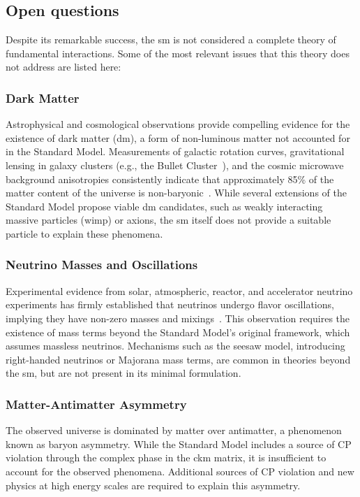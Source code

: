 \subsection*{Open questions}

Despite its remarkable success, the \acrshort{sm} is not considered a complete theory of fundamental interactions. Some of the most relevant issues that this theory does not address are listed here:
\subsubsection*{Dark Matter}

Astrophysical and cosmological observations provide compelling evidence for the existence of dark matter (\acrshort{dm}), a form of non-luminous matter not accounted for in the Standard Model. Measurements of galactic rotation curves, gravitational lensing in galaxy clusters (e.g., the Bullet Cluster~\cite{Clowe_2006}), and the cosmic microwave background anisotropies consistently indicate that approximately 85\% of the matter content of the universe is non-baryonic~\cite{Planck}. While several extensions of the Standard Model propose viable \acrshort{dm} candidates, such as weakly interacting massive particles (\acrshort{wimp}) or axions, the \acrshort{sm} itself does not provide a suitable particle to explain these phenomena.

\subsubsection*{Neutrino Masses and Oscillations}

Experimental evidence from solar, atmospheric, reactor, and accelerator neutrino experiments has firmly established that neutrinos undergo flavor oscillations, implying they have non-zero masses and mixings~\cite{PhysRevD.98.030001}. This observation requires the existence of mass terms beyond the Standard Model's original framework, which assumes massless neutrinos. Mechanisms such as the seesaw model, introducing right-handed neutrinos or Majorana mass terms, are common in theories beyond the \acrshort{sm}, but are not present in its minimal formulation.

\subsubsection*{Matter-Antimatter Asymmetry}

The observed universe is dominated by matter over antimatter, a phenomenon known as baryon asymmetry. While the Standard Model includes a source of CP violation through the complex phase in the \acrshort{ckm} matrix, it is insufficient to account for the observed phenomena. Additional sources of CP violation and new physics at high energy scales are required to explain this asymmetry.


